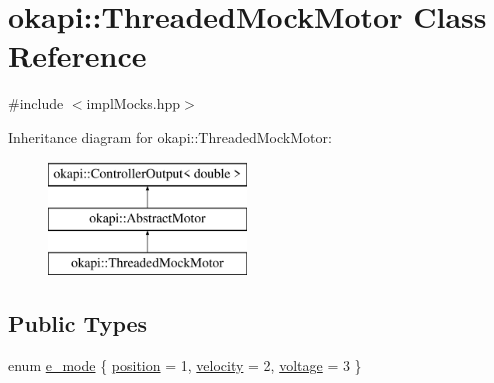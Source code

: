 \hypertarget{classokapi_1_1ThreadedMockMotor}{}\section{okapi\+::Threaded\+Mock\+Motor Class Reference}
\label{classokapi_1_1ThreadedMockMotor}


{\ttfamily \#include $<$impl\+Mocks.\+hpp$>$}

Inheritance diagram for okapi\+::Threaded\+Mock\+Motor\+:\begin{figure}[H]
\begin{center}
\leavevmode
\includegraphics[height=3.000000cm]{classokapi_1_1ThreadedMockMotor}
\end{center}
\end{figure}
\subsection*{Public Types}
\begin{DoxyCompactItemize}
\item 
enum \mbox{\hyperlink{classokapi_1_1ThreadedMockMotor_a3124c100c1cd16b1d123745ab9af4291}{e\+\_\+mode}} \{ \mbox{\hyperlink{classokapi_1_1ThreadedMockMotor_a3124c100c1cd16b1d123745ab9af4291abaaf7d79adb63d30a31fe976d9a0b4d7}{position}} = 1, 
\mbox{\hyperlink{classokapi_1_1ThreadedMockMotor_a3124c100c1cd16b1d123745ab9af4291a8a3e25ab4cc526fee2bc58561890b249}{velocity}} = 2, 
\mbox{\hyperlink{classokapi_1_1ThreadedMockMotor_a3124c100c1cd16b1d123745ab9af4291ab78e6c3edf68d89b0048d7047a59fa17}{voltage}} = 3
 \}
\end{DoxyCompactItemize}

